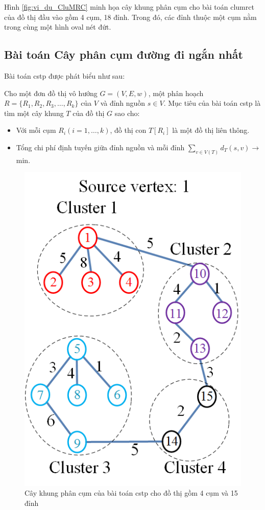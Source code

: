 Hình \ref{fig:vi_du_CluMRC} minh họa cây khung phân cụm cho bài toán \gls{clumrct} của đồ thị đầu vào gồm 4 cụm, 18 đỉnh. Trong đó, các đỉnh thuộc một cụm nằm trong cùng một hình oval nét đứt.

\subsection{Bài toán Cây phân cụm đường đi ngắn nhất} \label{chap_coso:sec_mfea:subsec:cstp}
Bài toán \gls{cstp} được phát biểu như sau:

Cho một đơn đồ thị vô hướng $G = (V, E, w)$, một phân hoạch $R = \{R_1, R_2, R_3,\ldots,R_k\}$ của $V$ và đỉnh nguồn $s \in V$. Mục tiêu của bài toán \gls{cstp} là tìm một cây khung $T$ của đồ thị $G$ sao cho:
\begin{itemize}
	\item Với mỗi cụm $R_i (i=1,\ldots, k)$, đồ thị con $T[R_i]$ là một đồ thị liên thông.
	\item Tổng chi phí định tuyến giữa đỉnh nguồn và mỗi đỉnh $\sum_{v \in V(T)} d_T (s,v) \rightarrow$ min.
\end{itemize}

\renewcommand{\scalefigure}{0.6}
\begin{figure}[htbp]
	\centering		
	\includegraphics[scale=\scalefigure]{Pictures/CSTP/CSTP.png}
	\centering
	\caption{Cây khung phân cụm của bài toán \gls{cstp} cho đồ thị gồm 4 cụm và 15 đỉnh}
	\label{fig:vi_du_CSTP}
\end{figure}

